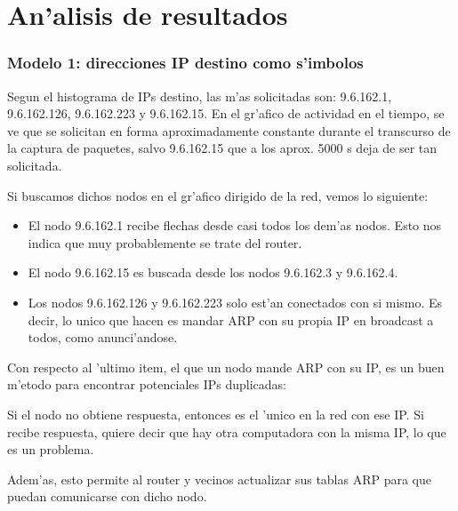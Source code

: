 \documentclass[a4paper,10pt]{article}
\begin{document}
\newpage

\clearpage

\section{An'alisis de resultados}
\label{analisis1:}

\subsubsection{Modelo 1: direcciones IP destino como s'imbolos}

Segun el histograma de IPs destino, las m'as solicitadas son: 9.6.162.1, 9.6.162.126, 9.6.162.223 y 9.6.162.15. En el gr'afico de actividad en el tiempo, se ve que se solicitan en forma aproximadamente constante durante el transcurso de la captura de paquetes, salvo 9.6.162.15 que a los aprox. 5000 s deja de ser tan solicitada. 

Si buscamos dichos nodos en el gr'afico dirigido de la red, vemos lo siguiente: 

\begin{itemize}
	\item El nodo 9.6.162.1 recibe flechas desde casi todos los dem'as nodos. Esto nos indica que muy probablemente se trate del router.
	\item El nodo 9.6.162.15 es buscada desde los nodos 9.6.162.3 y 9.6.162.4.
	\item Los nodos 9.6.162.126 y 9.6.162.223 solo est'an conectados con si mismo. Es decir, lo unico que hacen es mandar ARP con su propia IP en broadcast a todos, como anunci'andose.
\end{itemize}

Con respecto al 'ultimo item, el que un nodo mande ARP con su IP, es un buen m'etodo para encontrar potenciales IPs duplicadas:

Si el nodo no obtiene respuesta, entonces es el 'unico en la red con ese IP. Si recibe respuesta, quiere decir que hay otra computadora con la misma IP, lo que es un problema.

Adem'as, esto permite al router y vecinos actualizar sus tablas ARP para que puedan comunicarse con dicho nodo. 
\end{document}
